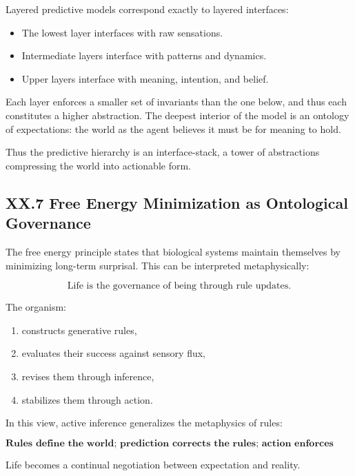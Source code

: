 \documentclass[12pt,letterpaper]{article}
\begin{document}
Layered predictive models correspond exactly to layered interfaces:

\begin{itemize}
    \item The lowest layer interfaces with raw sensations.
    \item Intermediate layers interface with patterns and dynamics.
    \item Upper layers interface with meaning, intention, and belief.
\end{itemize}

Each layer enforces a smaller set of invariants than the one below, and thus each constitutes a higher abstraction. The deepest interior of the model is an ontology of expectations: the world as the agent believes it must be for meaning to hold.

Thus the predictive hierarchy is an interface-stack, a tower of abstractions compressing the world into actionable form.

\subsection{XX.7 Free Energy Minimization as Ontological Governance}

The free energy principle states that biological systems maintain themselves by minimizing long-term surprisal. This can be interpreted metaphysically:

\[
\text{Life is the governance of being through rule updates.}
\]

The organism:

\begin{enumerate}
    \item constructs generative rules,
    \item evaluates their success against sensory flux,
    \item revises them through inference,
    \item stabilizes them through action.
\end{enumerate}

In this view, active inference generalizes the metaphysics of rules:

\[
\textbf{Rules define the world; prediction corrects the rules; action enforces them.}
\]

Life becomes a continual negotiation between expectation and reality.
\end{document}

